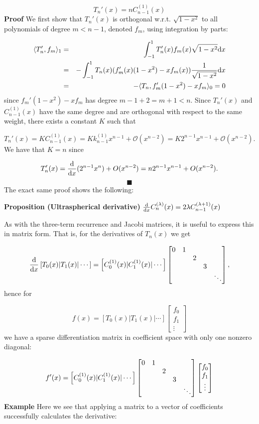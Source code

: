 \documentclass[12pt,a4paper]{article}
\begin{document}
\[
T_n'(x) = n C^{(1)}_{n-1}(x)
\]
\textbf{Proof} We first show that $T_n'(x)$ is orthogonal w.r.t. $\sqrt{1-x^2}$ to all  polynomials of degree $m < n-1$, denoted $f_m$, using integration by parts:


\begin{eqnarray*}
\langle T_n',f_m\rangle_{1} &=& \int_{-1}^1 T_n'(x) f_m(x) \sqrt{1-x^2} {\rm d}x \\
&=& -\int_{-1}^1 T_n(x) (f_m'(x)(1-x^2) - xf_m(x)) {1  \over \sqrt{1-x^2}} {\rm d}x  \\ 
&=& - \langle T_n, f_m'(1-x^2) - x f_m \rangle_{0}  = 0
\end{eqnarray*}
since $f_m'(1-x^2) - x f_m $ has degree $m-1 +2 = m+1 < n$.  Since $T_n'(x)$ and $C^{(1)}_{n-1}(x)$ have the same degree and are orthogonal with respect to the same weight, there exists a constant $K$ such that 

\[
T_n'(x) = KC^{(1)}_{n-1}(x) = K k_{n-1}^{(1)}x^{n-1} + \mathcal{O}(x^{n-2})= K 2^{n-1}x^{n-1} + \mathcal{O}(x^{n-2}).
\]
We have that $K = n$ since

\[
T_n'(x) = {{\rm d} \over {\rm d}x} (2^{n-1} x^n)  + O(x^{n-2}) = n 2^{n-1} x^{n-1} + O(x^{n-2}).
\]
\[
\blacksquare
\]
The exact same proof shows the following:

\textbf{Proposition (Ultraspherical derivative)} ${{\rm d} \over {\rm d}x} C_n^{(\lambda)}(x) = 2 \lambda  C_{n-1}^{(\lambda+1)}(x)$

As with the three-term recurrence and Jacobi matrices, it is useful to express this in matrix form. That is, for the derivatives of $T_n(x)$ we get

\[
{{\rm d} \over {\rm d}x}\left[T_0(x) | T_1(x) | \cdots \right] = \left[C_0^{(1)}(x) | C_1^{(1)}(x) | \cdots \right]\begin{bmatrix}
0 & 1 \cr
&& 2 \cr
&&& 3 \cr
&&&&\ddots
\end{bmatrix},
\]
hence for 

\[
f(x) = \left[T_0(x) | T_1(x) | \cdots \right] \begin{bmatrix} f_0\\f_1\\\vdots \end{bmatrix}
\]
we have a sparse differentiation matrix in coefficient space with only one nonzero diagonal: 

\[
f'(x) = \left[C_0^{(1)}(x) | C_1^{(1)}(x) | \cdots \right]\begin{bmatrix}
0 & 1 \cr
&& 2 \cr
&&& 3 \cr
&&&&\ddots
\end{bmatrix}  \begin{bmatrix} f_0\\f_1\\\vdots \end{bmatrix}
\]
\textbf{Example} Here we see that applying a matrix to a vector of coefficients successfully calculates the derivative:
\end{document}
